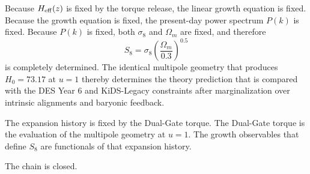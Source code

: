 Because \(H_{\rm eff}(z)\) is fixed by the torque release, the linear growth equation is fixed. Because the growth equation is fixed, the present-day power spectrum \(P(k)\) is fixed. Because \(P(k)\) is fixed, both \(\sigma_8\) and \(\Omega_m\) are fixed, and therefore
\[
S_8=\sigma_8\left(\frac{\Omega_m}{0.3}\right)^{0.5}
\]  
is completely determined. The identical multipole geometry that produces \(H_0=73.17\) at \(u=1\) thereby determines the theory prediction that is compared with the DES Year 6 and KiDS-Legacy constraints after marginalization over intrinsic alignments and baryonic feedback.

The expansion history is fixed by the Dual-Gate torque.  
The Dual-Gate torque is the evaluation of the multipole geometry at \(u=1\).  
The growth observables that define \(S_8\) are functionals of that expansion history.  

The chain is closed.
